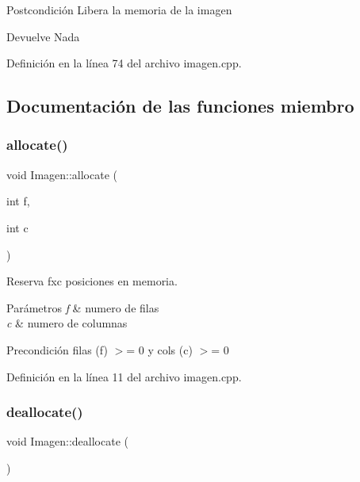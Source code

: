 \begin{DoxyPostcond}{Postcondición}
Libera la memoria de la imagen 
\end{DoxyPostcond}
\begin{DoxyReturn}{Devuelve}
Nada 
\end{DoxyReturn}


Definición en la línea 74 del archivo imagen.\+cpp.



\subsection{Documentación de las funciones miembro}
\mbox{\label{classImagen_a0d06b8762c40ab6b6d1da6d45c2024da}} 
\subsubsection{\texorpdfstring{allocate()}{allocate()}}
{\footnotesize\ttfamily void Imagen\+::allocate (\begin{DoxyParamCaption}\item[{int}]{f,  }\item[{int}]{c }\end{DoxyParamCaption})\hspace{0.3cm}{\ttfamily [private]}}



Reserva fxc posiciones en memoria. 


\begin{DoxyParams}{Parámetros}
{\em f} & numero de filas \\
\hline
{\em c} & numero de columnas \\
\hline
\end{DoxyParams}
\begin{DoxyPrecond}{Precondición}
filas (f) $>$= 0 y cols (c) $>$= 0 
\end{DoxyPrecond}


Definición en la línea 11 del archivo imagen.\+cpp.

\mbox{\label{classImagen_a50bdabe1d37bc418b2076e70a5a8402c}} 
\subsubsection{\texorpdfstring{deallocate()}{deallocate()}}
{\footnotesize\ttfamily void Imagen\+::deallocate (\begin{DoxyParamCaption}{ }\end{DoxyParamCaption})\hspace{0.3cm}{\ttfamily [private]}}



